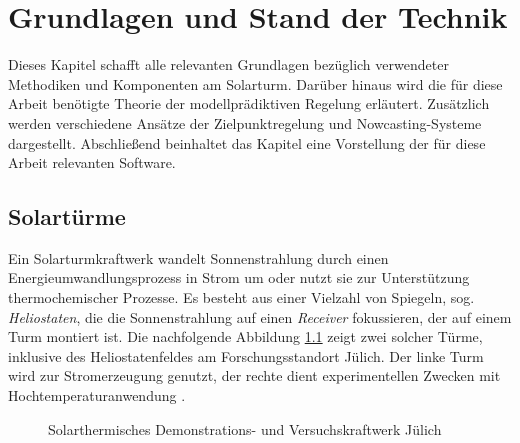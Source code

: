 \chapter{Grundlagen und Stand der Technik} \label{ch_StandTechnik}
Dieses Kapitel schafft alle relevanten Grundlagen bezüglich verwendeter Methodiken und Komponenten am Solarturm.
Darüber hinaus wird die für diese Arbeit benötigte Theorie der modellprädiktiven Regelung erläutert.
Zusätzlich werden verschiedene Ansätze der Zielpunktregelung und Nowcasting-Systeme dargestellt.
Abschließend beinhaltet das Kapitel eine Vorstellung der für diese Arbeit relevanten Software.

\section{Solartürme} \label{sec_Solartürme}
Ein Solarturmkraftwerk wandelt Sonnenstrahlung durch einen Energieumwandlungsprozess in Strom um oder nutzt sie zur Unterstützung thermochemischer Prozesse.
Es besteht aus einer Vielzahl von Spiegeln, sog. \textit{Heliostaten}, die die Sonnenstrahlung auf einen \textit{Receiver} fokussieren, der auf einem Turm montiert ist.
Die nachfolgende Abbildung \ref{fig_Solarturm} zeigt zwei solcher Türme, inklusive des Heliostatenfeldes am Forschungsstandort Jülich.
Der linke Turm wird zur Stromerzeugung genutzt, der rechte dient experimentellen Zwecken mit Hochtemperaturanwendung \cite{DLRSolartürmeBild}.

\begin{figure}[h!]
    \centering
    \setlength{\fboxsep}{1pt}
    \setlength{\fboxrule}{1pt}
\caption[Solarthermisches Demonstrations- und Versuchskraftwerk Jülich]{Solarthermisches Demonstrations- und Versuchskraftwerk Jülich \cite{DLRSolartürmeBild}}
    \label{fig_Solarturm}
\end{figure}

